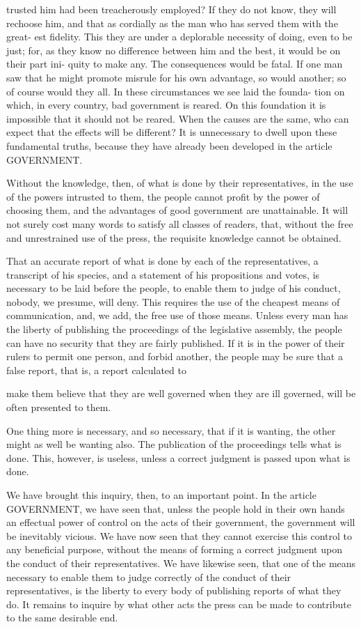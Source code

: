\documentclass{article}
\begin{document}
trusted him had been treacherously employed?
If they do not know, they will rechoose him, and that as
cordially as the man who has served them with the great-
est fidelity. This they are under a deplorable necessity
of doing, even to be just; for, as they know no difference
between him and the best, it would be on their part ini-
quity to make any. The consequences would be fatal.
If one man saw that he might promote misrule for his
own advantage, so would another; so of course would
they all. In these circumstances we see laid the founda-
tion on which, in every country, bad government is reared.
On this foundation it is impossible that it should not be
reared. When the causes are the same, who can expect
that the effects will be different? It is unnecessary to
dwell upon these fundamental truths, because they have
already been developed in the article GOVERNMENT.

Without the knowledge, then, of what is done by their representatives, in the use of the powers intrusted to them, the people cannot profit by the power of choosing them, and the advantages of good government are unattainable. It will not surely cost many words to satisfy all classes of readers, that, without the free and unrestrained use of the press, the requisite knowledge cannot be obtained.

That an accurate report of what is done by each of the representatives, a transcript of his species, and a statement of his propositions and votes, is necessary to be laid before the people, to enable them to judge of his conduct, nobody, we presume, will deny. This requires the use of the cheapest means of communication, and, we add, the free use of those means. Unless every man has the liberty of publishing the proceedings of the legislative assembly, the people can have no security that they are fairly published. If it is in the power of their rulers to permit one person, and forbid another, the people may be sure that a false report, that is, a report calculated to

make them believe that they are well governed when they are ill governed, will be often presented to them.

One thing more is necessary, and so necessary, that if it is wanting, the other might as well be wanting also. The publication of the proceedings tells what is done. This, however, is useless, unless a correct judgment is passed upon what is done.

We have brought this inquiry, then, to an important point. In the article GOVERNMENT, we have seen that, unless the people hold in their own hands an effectual power of control on the acts of their government, the government will be inevitably vicious. We have now seen that they cannot exercise this control to any beneficial purpose, without the means of forming a correct judgment upon the conduct of their representatives. We have likewise seen, that one of the means necessary to enable them to judge correctly of the conduct of their representatives, is the liberty to every body of publishing reports of what they do. It remains to inquire by what other acts the press can be made to contribute to the same desirable end.
\end{document}
